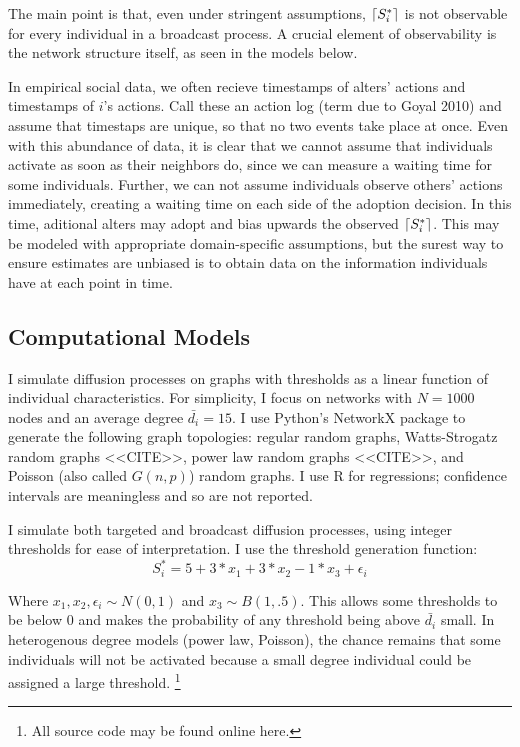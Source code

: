 \documentclass{article}
\DeclarePairedDelimiter{\ceil}{\lceil}{\rceil}
\begin{document}
The main point is that, even under stringent assumptions, $\ceil{S_i^*}$ is not observable for every individual in a broadcast process. A crucial element of observability is the network structure itself, as seen in the models below.

In empirical social data, we often recieve timestamps of alters' actions and timestamps of $i$'s actions. Call these an action log (term due to Goyal 2010) and assume that timestaps are unique, so that no two events take place at once. Even with this abundance of data, it is clear that we cannot assume that individuals activate as soon as their neighbors do, since we can measure a waiting time for some individuals. Further, we can not assume individuals observe others' actions immediately, creating a waiting time on each side of the adoption decision. In this time, aditional alters may adopt and bias upwards the observed $\ceil{S_i^*}$. This may be modeled with appropriate domain-specific assumptions, but the surest way to ensure estimates are unbiased is to obtain data on the information individuals have at each point in time.

\subsection{Computational Models}

I simulate diffusion processes on graphs with thresholds as a linear function of individual characteristics. For simplicity, I focus on networks with $N = 1000$ nodes and an average degree $\bar{d_i} = 15$. I use Python's NetworkX package to generate the following graph topologies: regular random graphs, Watts-Strogatz random graphs <<CITE>>, power law random graphs <<CITE>>, and Poisson (also called $G(n,p)$) random graphs. I use R for regressions; confidence intervals are meaningless and so are not reported. 

I simulate both targeted and broadcast diffusion processes, using integer thresholds for ease of interpretation. I use the threshold generation function: 
\[
S_i^* = 5 + 3*x_1 + 3*x_2 - 1*x_3 + \epsilon_i
\]

Where $x_1, x_2, \epsilon_i \sim N(0,1)$ and $x_3 \sim B(1,.5)$. This allows some thresholds to be below 0 and makes the probability of any threshold being above $\bar{d_i}$ small. In heterogenous degree models (power law, Poisson), the chance remains that some individuals will not be activated because a small degree individual could be assigned a large threshold. \footnote{All source code may be found online here.}
\end{document}
